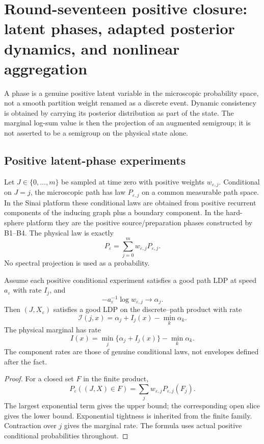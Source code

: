 \section{Round-seventeen positive closure: latent phases, adapted posterior dynamics, and nonlinear aggregation}
\label{sec:r17-d1}

A phase is a genuine positive latent variable in the microscopic probability
space, not a smooth partition weight renamed as a discrete event.  Dynamic
consistency is obtained by carrying its posterior distribution as part of the
state.  The marginal log-sum value is then the projection of an augmented
semigroup; it is not asserted to be a semigroup on the physical state alone.

\subsection{Positive latent-phase experiments}

Let $J\in\{0,\ldots,m\}$ be sampled at time zero with positive weights
$w_{\varepsilon,j}$.  Conditional on $J=j$, the microscopic path has law
$P_{\varepsilon,j}$ on a common measurable path space.  In the Sinai
platform these conditional laws are obtained from positive recurrent
components of the inducing graph plus a boundary component.  In the
hard-sphere platform they are the positive source/preparation phases
constructed by B1--B4.  The physical law is exactly
\[
 P_\varepsilon=\sum_{j=0}^m w_{\varepsilon,j}
 P_{\varepsilon,j}.
\]
No spectral projection is used as a probability.

\begin{theorem}
\label{thm:r17-d1-joint}
Assume each positive conditional experiment satisfies a good path LDP at
speed $a_\varepsilon$ with rate $I_j$, and
\[
 -a_\varepsilon^{-1}\log w_{\varepsilon,j}\to\alpha_j.
\]
Then $(J,X_\varepsilon)$ satisfies a good LDP on the discrete--path
product with rate
\[
 \mathcal I(j,x)=\alpha_j+I_j(x)-\min_k\alpha_k.
\]
The physical marginal has rate
\[
 I(x)=\min_j\{\alpha_j+I_j(x)\}
 -\min_k\alpha_k.
\]
The component rates are those of genuine conditional laws, not envelopes
defined after the fact.
\end{theorem}

\begin{proof}
For a closed set $F$ in the finite product,
\[
 P_\varepsilon((J,X)\in F)
 =\sum_j w_{\varepsilon,j}
 P_{\varepsilon,j}(F_j).
\]
The largest exponential term gives the upper bound; the corresponding open
slice gives the lower bound.  Exponential tightness is inherited from the
finite family.  Contraction over $j$ gives the marginal rate.  The formula
uses actual positive conditional probabilities throughout.
\end{proof}

